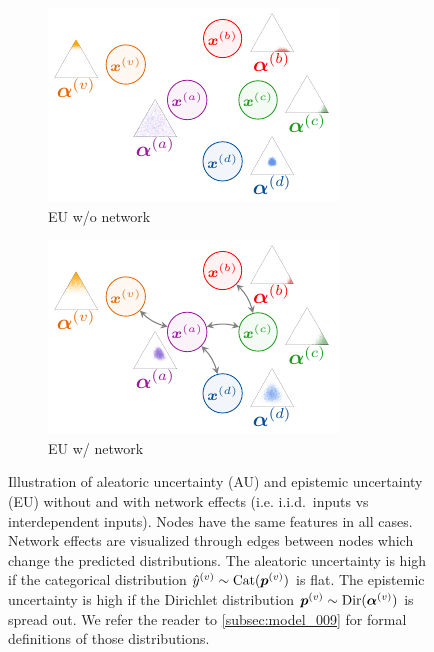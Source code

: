 \begin{figure}
\begin{subfigure}[t]{0.24\textwidth}
		\includegraphics[width=\textwidth]{sections/009_neurips2021/resources/no-network-epistemic.pdf}
		\caption{EU w/o network}
		\label{subfig:eu_without_network}
	\end{subfigure}
	\begin{subfigure}[t]{0.24\textwidth}
	    \centering
		\includegraphics[width=\textwidth]{sections/009_neurips2021/resources/network-epistemic.pdf}
		\caption{EU w/ network}
		\label{subfig:eu_with_network}
	\end{subfigure}
	\caption{Illustration of aleatoric uncertainty (AU) and epistemic uncertainty (EU) without and with network effects (i.e. i.i.d.\ inputs vs interdependent inputs). Nodes have the same features in all cases. Network effects are visualized through edges between nodes which change the predicted distributions. The aleatoric uncertainty is high if the categorical distribution $\hat{y} ^{(v)} \sim \operatorname{Cat}(\bm{p}^{(v)})$ is flat. The epistemic uncertainty is high if the Dirichlet distribution $\bm{p}^{(v)} \sim \operatorname{Dir}(\bm{\alpha}^{(v)})$ is spread out. We refer the reader to \cref{subsec:model_009} for formal definitions of those distributions.}
    \label{fig:uncertainty_types_small}
\end{figure}
